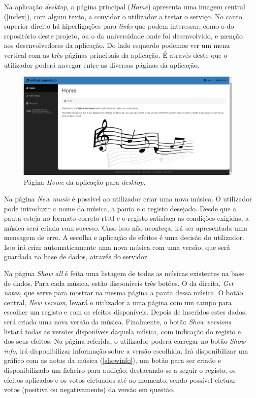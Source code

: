 \documentclass[11pt,openany,twoside]{report}
\begin{document}
Na aplicação \textit{desktop}, a página principal (\textit{Home}) apresenta uma imagem central (\autoref{index}), com algum texto, a convidar o utilizador a testar o serviço. No canto superior direito há hiperligações para \textit{links} que podem interessar, como o do repositório deste projeto, ou o da universidade onde foi desenvolvido, e menção aos desenvolvedores da aplicação. Do lado esquerdo podemos ver um menu vertical com as três páginas principais da aplicação. É através deste que o utilizador poderá navegar entre as diversas páginas da aplicação.

\begin{figure}
 \center
 \includegraphics[scale=.3]{index.png}
 \caption{Página \textit{Home} da aplicação para \textit{desktop}.}
 \label{index}
\end{figure}

Na página \textit{New music} é possível ao utilizador criar uma nova música. O utilizador pode introduzir o nome da música, a pauta e o registo desejado. Desde que a pauta esteja no formato correto \acs{rtttl} e o registo satisfaça as condições exigidas, a música será criada com sucesso. Caso isso não aconteça, irá ser apresentada uma mensagem de erro. A escolha e aplicação de efeitos é uma decisão do utilizador. Isto irá criar automaticamente uma nova música com uma versão, que será guardada na base de dados, através do servidor.

Na página \textit{Show all} é feita uma listagem de todas as músicas existentes na base de dados. Para cada música, estão disponíveis três botões. O da direita, \textit{Get notes}, que serve para mostrar na mesma página a pauta dessa música. O botão central, \textit{New version}, levará o utilizador a uma página com um campo para escolher um registo e com os efeitos disponíveis. Depois de inseridos estes dados, será criada uma nova versão da música. Finalmente, o botão \textit{Show versions} listará todas as versões disponíveis daquela música, com indicação do registo e dos seus efeitos. Na página referida, o utilizador poderá carregar no botão \textit{Show info}, irá disponibilizar informação sobre a versão escolhida. Irá disponibilizar um gráfico com as notas da música (\autoref{showinfo}), um botão para ser criado e disponibilizado um ficheiro para audição, destacando-se a seguir o registo, os efeitos aplicados e os votos efetuados até ao momento, sendo possível efetuar votos (positiva ou negativamente) da versão em questão.
\end{document}
